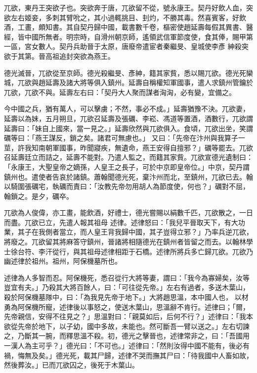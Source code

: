 
\begin{pinyinscope}

 兀欲，東丹王突欲子也。突欲奔于唐，兀欲留不從，號永康王。契丹好飲人血，突欲左右姬妾，多刺其臂吮之，其小過輒挑目、刲灼，不勝其毒。然喜賓客，好飲酒，工畫，頗知書。其自契丹歸中國，載書數千卷，樞密使趙延壽每假其異書、醫經，皆中國所無者。明宗時，自滑州朝京師，遙領武信軍節度使，食其俸，賜甲第一區，宮女數人。契丹兵助晉于太原，唐廢帝遣宦者秦繼旻、皇城使李彥
 紳殺突欲于其第。晉高祖追封突欲為燕王。



 德光滅晉，兀欲從至京師。德光殺繼旻、彥紳，籍其家貲，悉以賜兀欲。德光死欒城，兀欲與趙延壽及諸大將等俱入鎮州。延壽自稱權知軍國事，遣人求鎮州管鑰於兀欲，兀欲不與。延壽左右曰：「契丹大人聚而謀者洶洶，必有變，宜備之。



 今中國之兵，猶有萬人，可以擊虜；不然，事必不成。」延壽猶豫不決。兀欲妻，延壽以為妹，五月朔旦，兀欲召延壽及張礪、李崧、馮道等置酒，酒數行，兀欲謂延壽曰：「妹自上國來，當一見之。」延壽欣然與兀欲俱入。食頃，兀欲出坐，笑謂礪等曰：「燕王謀反，鎖之矣。諸君可無慮也。」
 又曰：「先帝在汴州與我算子一莖，許我知南朝軍國事，昨聞寢疾，無遺命，燕王安得自擅邪？」礪等罷去。兀欲召延壽廷立而詰之，延壽不能對。乃遣人監之，而籍其家貲。兀欲宣德光遺制曰：「永康王，大聖皇帝之嫡孫，人皇王之長子，可於中京即皇帝位。」中京，契丹謂鎮州也。遣使者告哀於諸鎮。蕭翰聞德光死，棄汴州而北，至鎮州，兀欲已去。翰以騎圍張礪宅，執礪而責曰：「汝教先帝勿用胡人為節度使，何也？」礪對不屈，翰鎖之。是夕，礪卒。



 兀欲為人俊偉，亦工畫，能飲酒，好禮士，德光嘗賜以絹數千匹，兀欲散之，一日而盡。兀欲已立，先遣人報其祖母
 述律。述律怒曰：「我兒平晉取天下，有大功業，其子在我側者當立，而人皇王背我歸中國，其子豈得立邪？」乃率兵逆兀欲，將廢之。兀欲留其將麻答守鎮州，晉諸將相隨德光在鎮州者皆留之而去。以翰林學士徐台符、李汗從行，與其祖母述律相距于石橋。述律所將兵多亡歸兀欲。兀欲乃幽述律於祖州。祖州，阿保機墓所也。



 述律為人多智而忍。阿保機死，悉召從行大將等妻，謂曰：「我今為寡婦矣，汝等豈宜有夫。」乃殺其大將百餘人，曰：「可往從先帝。」左右有過者，多送木葉山，殺於阿保機墓隊中，曰：「為我見先帝于地下。」大將趙思溫，本中國人也，
 以材勇為阿保機所寵，述律後以事怒之，使送木葉山，思溫辭不肯行。述律曰；「爾，先帝親信，安得不往見之？」思溫對曰：「親莫如后，后何不行？」述律曰：「我本欲從先帝於地下，以子幼，國中多故，未能也。然可斷吾一臂以送之。」左右切諫之，乃斷其一腕，而釋思溫不殺。初，德光之擊晉也，述律常非之，曰：「吾國用一漢人為主可乎？」德光曰：「不可也。」述律曰：「然則汝得中國不能有，後必有禍，悔無及矣。」德光死，載其尸歸，述律不哭而撫其尸曰：「待我國中人畜如故，然後葬汝。」已而兀欲囚之，後死于木葉山。




\end{pinyinscope}
